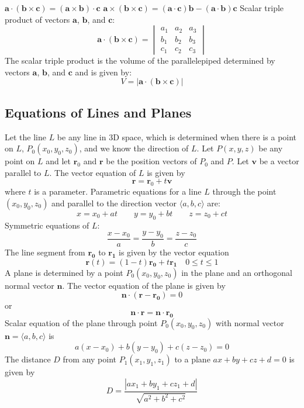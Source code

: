 \documentclass{article}
\begin{document}
\begin{outline}
            \2 \(\mathbf{a\cdot(b\times c)}=\mathbf{(a\times b)\cdot c}\)
            \2 \(\mathbf{a\times(b\times c)}=\mathbf{(a\cdot c)b-(a\cdot b)c}\)
        \1 Scalar triple product of vectors \(\mathbf a\), \(\mathbf b\), and \(\mathbf c\): \[\mathbf{a\cdot(b\times c)}=\begin{vmatrix}
            a_1 & a_2 & a_3\\
            b_1 & b_2 & b_3 \\
            c_1 & c_2 & c_3
        \end{vmatrix}\]
        \1 The scalar triple product is the volume of the parallelepiped determined by vectors \(\mathbf a\), \(\mathbf b\), and \(\mathbf c\) and is given by: \[V=|\mathbf{a\cdot(b\times c)}|\]

    \end{outline}
    \subsection{Equations of Lines and Planes}
    \begin{outline}
        \1 Let the line $L$ be any line in 3D space, which is determined when there is a point on $L$, \(P_0(x_0,y_0,z_0)\), and we know the direction of $L$. Let \(P(x,y,z)\) be any point on $L$ and let \(\mathbf r_0\) and \(\mathbf r\) be the position vectors of \(P_0\) and \(P\). Let \(\mathbf v\) be a vector parallel to $L$. The vector equation of $L$ is given by \[\mathbf r=\mathbf r_0+t\mathbf v\] where $t$ is a parameter. 
        \1 Parametric equations for a line $L$ through the point \((x_0,y_0,z_0)\) and parallel to the direction vector \(\langle a,b,c\rangle\) are: \[x=x_0+at\qquad y=y_0+bt\qquad z=z_0+ct\]
        \1 Symmetric equations of $L$: \[\dfrac{x-x_0}{a}=\dfrac{y-y_0}{b}=\dfrac{z-z_0}{c}\]
        \1 The line segment from \(\mathbf{r_0}\) to \(\mathbf{r_1}\) is given by the vector equation \[\mathbf r(t)=(1-t)\mathbf{r_0}+t\mathbf{r_1}\quad 0\leq t\leq 1\]
        \1 A plane is determined by a point \(P_0(x_0,y_0,z_0)\) in the plane and an orthogonal normal vector \(\mathbf n\). The vector equation of the plane is given by \[\mathbf{n\cdot}(\mathbf{r}-\mathbf{r_0})=0\] or \[\mathbf{n\cdot r}=\mathbf{n\cdot r_0}\]
        \1 Scalar equation of the plane through point \(P_0(x_0,y_0,z_0)\) with normal vector \(\mathbf n=\langle a,b,c\rangle\) is \[a(x-x_0)+b(y-y_0)+c(z-z_0)=0\]
        \1 The distance $D$ from any point \(P_1(x_1,y_1,z_1)\) to a plane \(ax+by+cz+d=0\) is given by \[D=\dfrac{|ax_1+by_1+cz_1+d|}{\sqrt{a^2+b^2+c^2}}\]

    \end{outline}
\end{document}
